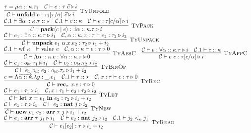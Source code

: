 \documentclass[fleqn]{article}
\begin{document}
\[\begin{array}{l}
    \infer[\textsc{TyUnfold}]{\mathcal{C} \vdash \mathbf{unfold}~e : \tau_1[\tau/\alpha]~\vec{c} \triangleright i}{\tau = \mu \alpha :: \kappa. \tau_1 & \mathcal{C} \vdash e : \tau~\vec{c} \triangleright i} \\
    \infer[\textsc{TyPack}]{\mathcal{C} \vdash \mathbf{pack}\langle c \mid e \rangle : \exists \alpha :: \kappa. \tau \triangleright i}{\mathcal{C}.1 \vdash \exists \alpha :: \kappa. \tau :: \star & \mathcal{C}.1 \vdash c :: \kappa & \mathcal{C} \vdash e : \tau[c/\alpha] \triangleright i} \\
    \infer[\textsc{TyUnpack}]{\mathcal{C} \vdash \mathbf{unpack}~e_1~\alpha.x.e_2 : \tau_2 \triangleright i_1 + i_2}{\mathcal{C} \vdash e_1 : \exists \alpha :: \kappa. \tau \triangleright i_1 & \mathcal{C},\alpha::\kappa,x:\tau \vdash e_2 : \tau_2 \triangleright i_2} \\
    \infer[\textsc{TyAbsC}]{\mathcal{C} \vdash \Lambda \alpha :: \kappa. e : \forall \alpha :: \kappa. \tau \triangleright 0}{\mathcal{C}.1 \vdash \mathrm{wf}~\kappa & \vdash \mathrm{value}~e & \mathcal{C},\alpha :: \kappa \vdash e : \tau \triangleright 0} \hspace{1em}
    \infer[\textsc{TyAppC}]{\mathcal{C} \vdash e~c : \tau[c/\alpha] \triangleright i}{\mathcal{C} \vdash e : \forall \alpha :: \kappa. \tau \triangleright i & \mathcal{C}.1 \vdash c :: \kappa} \\
    \infer[\textsc{TyBinOp}]{\mathcal{C} \vdash e_1~o_{bt}~e_2 : o_{bt}.\tau_r \triangleright i_1 + i_2}{\mathcal{C} \vdash e_1 : o_{bt}.\tau_1 \triangleright i_1 & \mathcal{C} \vdash e_2 : o_{bt}.\tau_2 \triangleright i_2} \\
    \infer[\textsc{TyRec}]{\mathcal{C} \vdash \mathbf{rec}_\tau~x. e : \tau \triangleright 0}{e = \Lambda \overrightarrow{\alpha :: \kappa}. \lambda y : \_. e_1 & \mathcal{C}.1 \vdash \tau :: \star & \mathcal{C},x:\tau \vdash e : \tau \triangleright 0} \\
    \infer[\textsc{TyLet}]{\mathcal{C} \vdash \mathbf{let}~x=e_1~\mathbf{in}~e_2 : \tau_2 \triangleright i_1 + i_2}{\mathcal{C} \vdash e_1 : \tau_1 \triangleright i_1 & \mathcal{C},x:\tau_1 \vdash e_2 : \tau_2 \triangleright i_2} \\
    \infer[\textsc{TyNew}]{\mathcal{C} \vdash \mathbf{new}~e_1~e_2 : \mathbf{arr}~\tau~j \triangleright i_1 + i_2}{\mathcal{C} \vdash e_1 : \tau \triangleright i_1 & \mathcal{C} \vdash e_2 : \mathbf{nat}~j \triangleright i_2} \\
    \infer[\textsc{TyRead}]{\mathcal{C} \vdash e_1[e_2] : \tau \triangleright i_1 + i_2}{\mathcal{C} \vdash e_1 : \mathbf{arr}~\tau~j_1 \triangleright i_1 & \mathcal{C} \vdash e_2 : \mathbf{nat}~j_2 \triangleright i_2 & \mathcal{C}.1 \vdash j_2 <_n j_1} \\

\end{array}\]
\end{document}
